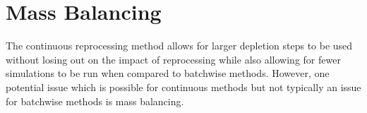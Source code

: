 






\section{Mass Balancing}

The continuous reprocessing method allows for larger depletion steps to be used without losing out on the impact of reprocessing while also allowing for fewer simulations to be run when compared to batchwise methods. However, one potential issue which is possible for continuous methods but not typically an issue for batchwise methods is mass balancing. 

